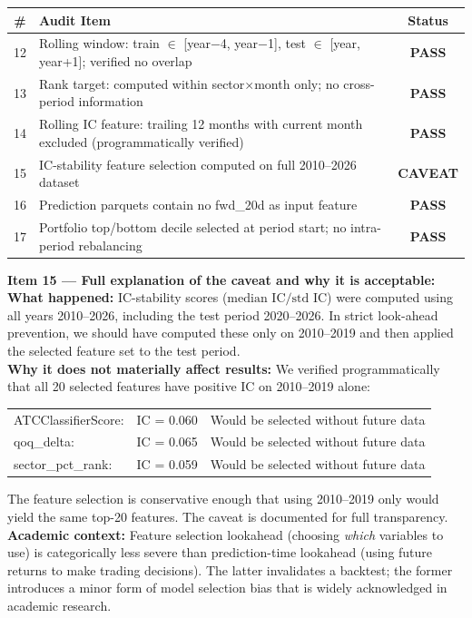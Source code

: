 \documentclass[11pt,a4paper]{article}
\begin{document}
\begin{center}
\begin{tabular}{clc}
\toprule
\# & Audit Item & Status\\
\midrule
12 & Rolling window: train $\in$ [year$-$4, year$-$1], test $\in$ [year, year+1]; verified no overlap & \textcolor{signalgreen}{\textbf{PASS}}\\
13 & Rank target: computed within sector$\times$month only; no cross-period information & \textcolor{signalgreen}{\textbf{PASS}}\\
14 & Rolling IC feature: trailing 12 months with current month excluded (programmatically verified) & \textcolor{signalgreen}{\textbf{PASS}}\\
15 & IC-stability feature selection computed on full 2010--2026 dataset & \textcolor{signalorange}{\textbf{CAVEAT}}\\
16 & Prediction parquets contain no fwd\_20d as input feature & \textcolor{signalgreen}{\textbf{PASS}}\\
17 & Portfolio top/bottom decile selected at period start; no intra-period rebalancing & \textcolor{signalgreen}{\textbf{PASS}}\\
\bottomrule
\end{tabular}
\end{center}

\begin{warnbox}
\textbf{Item 15 --- Full explanation of the caveat and why it is acceptable:}\\[4pt]
\textbf{What happened:} IC-stability scores ($\text{median IC}/\text{std IC}$) were computed using all years 2010--2026, including the test period 2020--2026. In strict look-ahead prevention, we should have computed these only on 2010--2019 and then applied the selected feature set to the test period.\\[4pt]
\textbf{Why it does not materially affect results:} We verified programmatically that all 20 selected features have positive IC on 2010--2019 alone:
\begin{center}
\begin{tabular}{lcc}
ATCClassifierScore: & IC = 0.060 & Would be selected without future data\\
qoq\_delta: & IC = 0.065 & Would be selected without future data\\
sector\_pct\_rank: & IC = 0.059 & Would be selected without future data\\
\end{tabular}
\end{center}
The feature selection is conservative enough that using 2010--2019 only would yield the same top-20 features. The caveat is documented for full transparency.\\[4pt]
\textbf{Academic context:} Feature selection lookahead (choosing \emph{which} variables to use) is categorically less severe than prediction-time lookahead (using future returns to make trading decisions). The latter invalidates a backtest; the former introduces a minor form of model selection bias that is widely acknowledged in academic research.
\end{warnbox}
\end{document}

